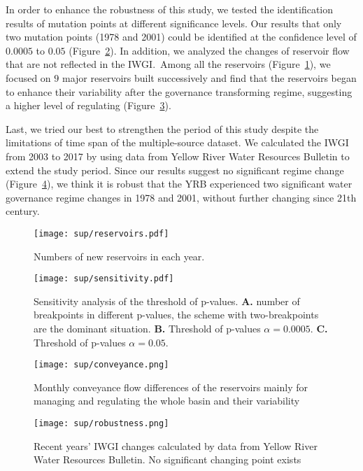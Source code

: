 In order to enhance the robustness of this study, we tested the identification results of mutation points at different significance levels.
Our results that only two mutation points (1978 and 2001) could be identified at the confidence level of $0.0005$ to $0.05$ (Figure~\ref{fig:sensitivity}).
In addition, we analyzed the changes of reservoir flow that are not reflected in the IWGI.\ Among all the reservoirs (Figure~\ref{fig:reservoirs}), we focused on $9$ major reservoirs built successively and find that the reservoirs began to enhance their variability after the governance transforming regime, suggesting a higher level of regulating (Figure~\ref{fig:conveyance}).

Last, we tried our best to strengthen the period of this study despite the limitations of time span of the multiple-source dataset. We calculated the IWGI from 2003 to 2017 by using data from Yellow River Water Resources Bulletin to extend the study period. Since our results suggest no significant regime change (Figure~\ref{fig:recent}), we think it is robust that the YRB experienced two significant water governance regime changes in 1978 and 2001, without further changing since 21th century.

\begin{figure}[tb]
    \centering
    \texttt{[image: sup/reservoirs.pdf]}
    \caption{
          Numbers of new reservoirs in each year.
    }\label{fig:reservoirs}
\end{figure}

\begin{figure}
    \centering
    \texttt{[image: sup/sensitivity.pdf]}
    \caption{
          Sensitivity analysis of the threshold of p-values.
          \textbf{A.} number of breakpoints in different p-values, the scheme with two-breakpoints are the dominant situation.
          \textbf{B.} Threshold of p-values \(\alpha=0.0005\).
          \textbf{C.} Threshold of p-values \(\alpha=0.05\).
    }\label{fig:sensitivity}
\end{figure}


\begin{figure}[htb]
    \centering
    \texttt{[image: sup/conveyance.png]}
    \caption{Monthly conveyance flow differences of the reservoirs mainly for managing and regulating the whole basin and their variability}\label{fig:conveyance}
\end{figure}


\begin{figure}[!htb]
	\centering
	\texttt{[image: sup/robustness.png]}
	\caption{Recent years' IWGI changes calculated by data from Yellow River Water Resources Bulletin. No significant changing point exists}\label{fig:recent}
\end{figure}
